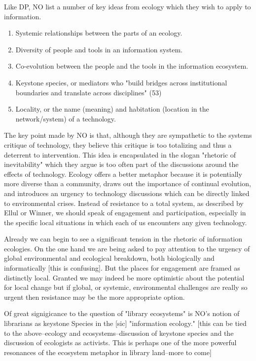Like DP, NO list a number of key ideas from ecology which they wish to apply to information.

\begin{enumerate}
\item Systemic relationships between the parts of an ecology.
\item Diversity of people and tools in an information system.
\item Co-evolution between the people and the tools in the information ecosystem.
\item Keystone species, or mediators who "build bridges across institutional boundaries and translate across disciplines" (53)
\item Locality, or the name (meaning) and habitation (location in the network/system) of a technology.
\end{enumerate}

The key point made by NO is that, although they are sympathetic to the systems critique of technology, they believe this critique is too totalizing and thus a deterrent to intervention. This idea is encapsulated in the slogan "rhetoric of inevitability" which they argue is too often part of the discussions around the effects of technology. Ecology offers a better metaphor because it is potentially more diverse than a community, draws out the importance of continual evolution, and introduces an urgency to technology discussions which can be directly linked to environmental crises. Instead of resistance to a total system, as described by Ellul or Winner, we should speak of engagement and participation, especially in the specific local situations in which each of us encounters any given technology.

Already we can begin to see a significant tension in the rhetoric of information ecologies. On the one hand we are being asked to pay attention to the urgency of global environmental and ecological breakdown, both biologically and informatically [this is confusing]. But the places for engagement are framed as distinctly local. Granted we may indeed be more optimistic about the potential for local change but if global, or systemic, environmental challenges are really so urgent then resistance may be the more appropriate option.

Of great signigicance to the question of "library ecosystems" is NO's notion of librarians as keystone Species in the [sic] "information ecology." [this can be tied to the above--ecology and ecosystems--discussion of keystone species and the discussion of ecologists as activists. This is perhaps one of the more powerful resonances of the ecosystem metaphor in library land--more to come]